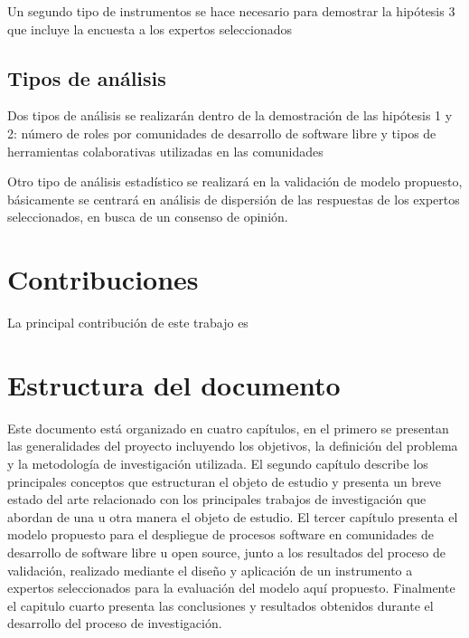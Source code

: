 Un segundo tipo de instrumentos se hace necesario para demostrar la hipótesis 3 que incluye la encuesta a los expertos seleccionados

\subsection{Tipos de análisis}
Dos tipos de análisis se realizarán dentro de la demostración de las hipótesis 1 y 2: número de roles por comunidades de desarrollo de software libre y tipos de herramientas colaborativas utilizadas en las comunidades

Otro tipo de análisis estadístico se realizará en la validación de modelo propuesto, básicamente se centrará en análisis de dispersión de las respuestas de los expertos seleccionados, en busca de un consenso de opinión.


\section{Contribuciones}

La principal contribución de este trabajo es 


\section{Estructura del documento}

Este documento está organizado en cuatro capítulos, en el primero se presentan las generalidades del proyecto incluyendo los objetivos, la definición del problema y la metodología de investigación utilizada.
El segundo capítulo describe los principales conceptos que estructuran el objeto de estudio y presenta un breve estado del arte relacionado con los principales trabajos de investigación que abordan de una u otra manera el objeto de estudio.
El tercer capítulo presenta el modelo propuesto para el despliegue de procesos software en comunidades de desarrollo de software libre u open source, junto a los resultados del proceso de validación, realizado mediante el diseño y aplicación de un instrumento a expertos seleccionados para la evaluación del modelo aquí propuesto.
Finalmente el capitulo cuarto presenta las conclusiones y resultados obtenidos durante el desarrollo del proceso de investigación.

